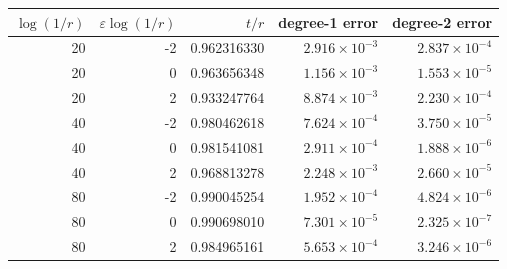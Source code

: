 \begin{tabular}{rrrrr}
\toprule
$\log(1/r)$ & $\varepsilon\log(1/r)$ & $t/r$ & degree-1 error & degree-2 error\\
\midrule
20 & -2 & 0.962316330 & $2.916\times10^{-3}$ & $2.837\times10^{-4}$ \\
20 & 0 & 0.963656348 & $1.156\times10^{-3}$ & $1.553\times10^{-5}$ \\
20 & 2 & 0.933247764 & $8.874\times10^{-3}$ & $2.230\times10^{-4}$ \\
40 & -2 & 0.980462618 & $7.624\times10^{-4}$ & $3.750\times10^{-5}$ \\
40 & 0 & 0.981541081 & $2.911\times10^{-4}$ & $1.888\times10^{-6}$ \\
40 & 2 & 0.968813278 & $2.248\times10^{-3}$ & $2.660\times10^{-5}$ \\
80 & -2 & 0.990045254 & $1.952\times10^{-4}$ & $4.824\times10^{-6}$ \\
80 & 0 & 0.990698010 & $7.301\times10^{-5}$ & $2.325\times10^{-7}$ \\
80 & 2 & 0.984965161 & $5.653\times10^{-4}$ & $3.246\times10^{-6}$ \\
\bottomrule
\end{tabular}
